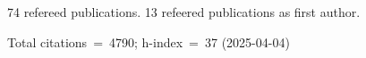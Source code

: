 74 refereed publications. 13 refeered publications as first author.

Total citations~=~4790; h-index~=~37 (2025-04-04)